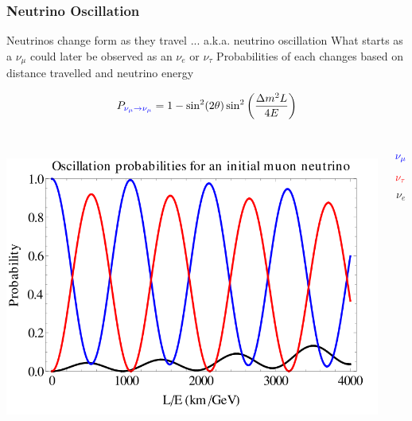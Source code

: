 \documentclass[10pt,professionalfonts,xcolor=table]{beamer}
\begin{document}
\begin{frame}
\end{frame}

\frame
{
  \frametitle{Neutrino Oscillation}
  \bangon
  \bang Neutrinos change form as they travel
	  \bangon
	  \bing ... a.k.a. neutrino oscillation
	  \bing What starts as a $\nu_\mu$ could later be observed as an $\nu_e$ or $\nu_\tau$
	  \bing Probabilities of each changes based on distance travelled and neutrino energy
	  \bangoff
  \bangoff
\begin{center}
  \begin{equation*}
  P_{\color{blue}\nu_\mu \rightarrow \nu_\mu} = 1 - \sin^2(2\theta) \sin^2\bigg(\frac{\Delta m^2 L}{4 E}\bigg)
  \end{equation*}
\gap

  \begin{columns}[c]
    ~
  \includegraphics[width=1\textwidth]{figures/figures/osc_prob.png}
  \vspace{-70pt}

  \begin{equation*}
  \color{blue}
  \nu_\mu
  \end{equation*}
  \vspace{-20pt}
  \begin{equation*}
  \color{red}
  \nu_\tau
  \end{equation*}
  \vspace{-17pt}
  \begin{equation*}
  \nu_e
  \end{equation*}
  \gap
  ~

  \end{columns}


\end{center}


}
\end{document}
